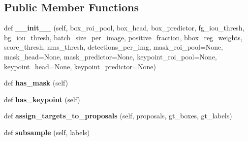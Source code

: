 \subsection*{Public Member Functions}
\begin{DoxyCompactItemize}
\item 
\mbox{\label{classtorchvision_1_1models_1_1detection_1_1roi__heads_1_1RoIHeads_ae5e761621848d5dfa97dc2fe72ae9767}} 
def {\bfseries \+\_\+\+\_\+init\+\_\+\+\_\+} (self, box\+\_\+roi\+\_\+pool, box\+\_\+head, box\+\_\+predictor, fg\+\_\+iou\+\_\+thresh, bg\+\_\+iou\+\_\+thresh, batch\+\_\+size\+\_\+per\+\_\+image, positive\+\_\+fraction, bbox\+\_\+reg\+\_\+weights, score\+\_\+thresh, nms\+\_\+thresh, detections\+\_\+per\+\_\+img, mask\+\_\+roi\+\_\+pool=None, mask\+\_\+head=None, mask\+\_\+predictor=None, keypoint\+\_\+roi\+\_\+pool=None, keypoint\+\_\+head=None, keypoint\+\_\+predictor=None)
\item 
\mbox{\label{classtorchvision_1_1models_1_1detection_1_1roi__heads_1_1RoIHeads_add9704da2122a5c3e388fb5dd0000ab0}} 
def {\bfseries has\+\_\+mask} (self)
\item 
\mbox{\label{classtorchvision_1_1models_1_1detection_1_1roi__heads_1_1RoIHeads_a62daa11fa8aad607d0fa93d4828bf917}} 
def {\bfseries has\+\_\+keypoint} (self)
\item 
\mbox{\label{classtorchvision_1_1models_1_1detection_1_1roi__heads_1_1RoIHeads_aaea22846114e1b042230407da28c5b5c}} 
def {\bfseries assign\+\_\+targets\+\_\+to\+\_\+proposals} (self, proposals, gt\+\_\+boxes, gt\+\_\+labels)
\item 
\mbox{\label{classtorchvision_1_1models_1_1detection_1_1roi__heads_1_1RoIHeads_a9fdebf3810f7133f437eacd6e645d7ea}} 
def {\bfseries subsample} (self, labels)
\item 
\mbox{\label{classtorchvision_1_1models_1_1detection_1_1roi__heads_1_1RoIHeads_a61415c36357904467198df7506262e85}} 

\end{DoxyCompactItemize}
